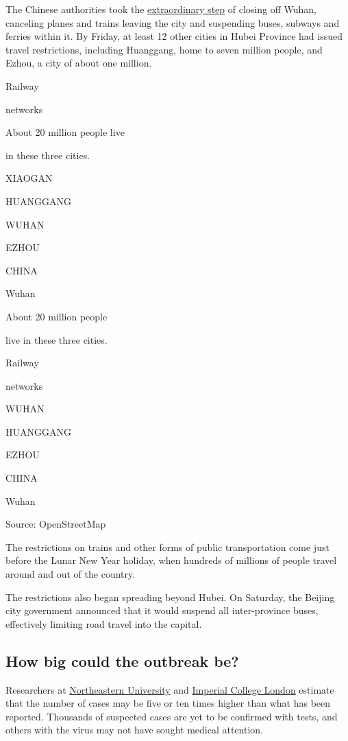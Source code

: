 The Chinese authorities took the
\href{https://www.nytimes.com/2020/01/22/world/asia/coronavirus-quarantines-history.html}{extraordinary
step} of closing off Wuhan, canceling planes and trains leaving the city
and suspending buses, subways and ferries within it. By Friday, at least
12 other cities in Hubei Province had issued travel restrictions,
including Huanggang, home to seven million people, and Ezhou, a city of
about one million.

Railway

networks

About 20 million people live

in these three cities.

XIAOGAN

HUANGGANG

WUHAN

EZHOU

CHINA

Wuhan

About 20 million people

live in these three cities.

Railway

networks

WUHAN

HUANGGANG

EZHOU

CHINA

Wuhan

Source: OpenStreetMap

The restrictions on trains and other forms of public transportation come
just before the Lunar New Year holiday, when hundreds of millions of
people travel around and out of the country.

The restrictions also began spreading beyond Hubei. On Saturday, the
Beijing city government announced that it would suspend all
inter-province buses, effectively limiting road travel into the capital.

\hypertarget{how-big-could-the-outbreak-be}{%
\subsection{How big could the outbreak
be?}\label{how-big-could-the-outbreak-be}}

Researchers at
\href{https://www.mobs-lab.org/2019ncov.html}{Northeastern University}
and
\href{https://www.imperial.ac.uk/mrc-global-infectious-disease-analysis/news--wuhan-coronavirus/}{Imperial
College London} estimate that the number of cases may be five or ten
times higher than what has been reported. Thousands of suspected cases
are yet to be confirmed with tests, and others with the virus may not
have sought medical attention.

